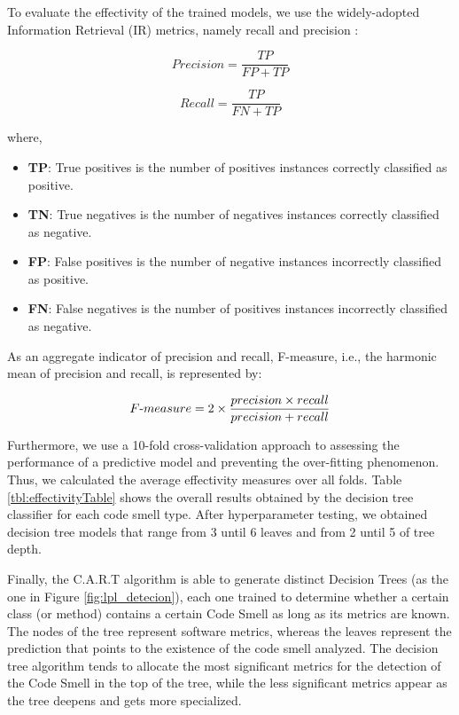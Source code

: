 To evaluate the effectivity of the trained models, we use the 
widely-adopted Information Retrieval (IR) metrics, namely recall and precision \cite{baeza1999modern, rokach2008data}:

\[Precision = \frac{TP}{FP +TP} \]

\[Recall = \frac{TP}{FN +TP} \]

where,

\begin{itemize}
\item \textbf{TP}: True positives is the number of positives instances correctly classified as positive.
\item \textbf{TN}: True negatives is the number of negatives instances correctly classified as negative.\par
\item \textbf{FP}: False positives is the number of negative instances incorrectly classified as positive. \par
\item \textbf{FN}: False negatives is the number of positives instances incorrectly classified as negative.\par
\end{itemize}

As an aggregate indicator of precision and recall, F-measure, i.e., the harmonic mean of precision and recall, is represented by:

\[ F{\text -}measure = 2\times\frac{precision \times recall}{precision+recall} \]

Furthermore, we use a 10-fold cross-validation approach to assessing the performance of a predictive model and preventing the over-fitting phenomenon. Thus, we calculated the average effectivity measures over all folds. Table \ref{tbl:effectivityTable} shows the overall results obtained by the decision tree classifier for each code smell type. After hyperparameter testing, we obtained decision tree models that range from 3 until 6 leaves and from 2 until 5 of tree depth.

Finally, the C.A.R.T algorithm is able to generate distinct Decision Trees (as the one in Figure \ref{fig:lpl_detecion}), each one trained to determine whether a certain class (or method) contains a certain Code Smell as long as its metrics are known. The nodes of the tree represent software metrics, whereas the leaves represent the prediction that points to the existence of the code smell analyzed. The decision tree algorithm tends to allocate the most significant metrics for the detection of the Code Smell in the top of the tree, while the less significant metrics appear as the tree deepens and gets more specialized.

